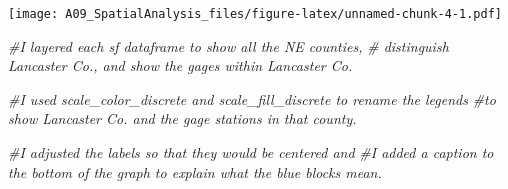 \documentclass[
]{article}
\newenvironment{Shaded}{\begin{snugshade}}{\end{snugshade}}
\newcommand{\CommentTok}[1]{\textcolor[rgb]{0.56,0.35,0.01}{\textit{#1}}}
\begin{document}
\texttt{[image: A09\_SpatialAnalysis\_files/figure-latex/unnamed-chunk-4-1.pdf]}

\begin{Shaded}
\begin{Highlighting}[]
\CommentTok{\#I layered each sf dataframe to show all the NE counties, }
\CommentTok{\# distinguish Lancaster Co., and show the gages within Lancaster Co. }

\CommentTok{\#I used scale\_color\_discrete and scale\_fill\_discrete to rename the legends }
\CommentTok{\#to show Lancaster Co. and the gage stations in that county. }

\CommentTok{\#I adjusted the labels so that they would be centered and}
\CommentTok{\#I added a caption to the bottom of the graph to explain what the blue blocks mean. }
\end{Highlighting}
\end{Shaded}
\end{document}
